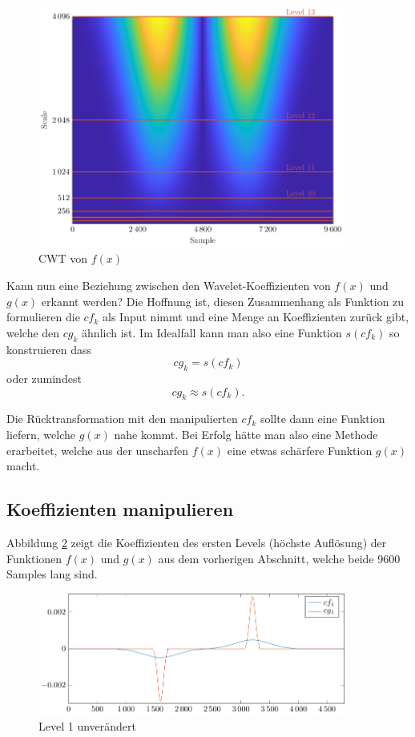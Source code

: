 \begin{figure}[h]
\centering
\includegraphics[width=0.9\textwidth]{./papers/deconvolve/pictures/y1_cwt.pdf}
\caption{CWT von $f(x)$\label{deconvolve:y1_cwt}}
\end{figure}

Kann nun eine Beziehung zwischen den Wavelet-Koeffizienten von $f(x)$ und $g(x)$ erkannt werden?
Die Hoffnung ist, diesen Zusammenhang als Funktion zu formulieren die $cf_k$ als Input nimmt und eine Menge an Koeffizienten zurück gibt, welche den $cg_k$ ähnlich ist.
Im Idealfall kann man also eine Funktion $s(cf_k)$ so konstruieren dass
$$cg_k = s(cf_k)$$
oder zumindest
$$cg_k \approx s(cf_k).$$

Die Rücktransformation mit den manipulierten $cf_k$ sollte dann eine Funktion liefern, welche $g(x)$ nahe kommt.
Bei Erfolg hätte man also eine Methode erarbeitet, welche aus der \glqq unscharfen\grqq{} $f(x)$ eine etwas \glqq schärfere\grqq{} Funktion $g(x)$ macht. 

\subsection{Koeffizienten manipulieren}
Abbildung \ref{deconvolve:level1} zeigt die Koeffizienten des ersten Levels (höchste Auflösung) der Funktionen $f(x)$ und $g(x)$ aus dem vorherigen Abschnitt, welche beide 9600 Samples lang sind.
\begin{figure}[h]
\centering
\includegraphics[width=0.9\textwidth]{./papers/deconvolve/pictures/level/level1.pdf}
\caption{Level 1 unverändert\label{deconvolve:level1}}
\end{figure}

